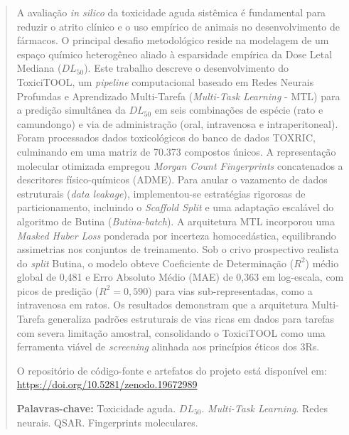\documentclass[12pt, a4paper]{article}
\begin{document}
\newpage
\begin{abstract}
\noindent
A avaliação \textit{in silico} da toxicidade aguda sistêmica é fundamental para reduzir o atrito clínico e o uso empírico de animais no desenvolvimento de fármacos. O principal desafio metodológico reside na modelagem de um espaço químico heterogêneo aliado à esparsidade empírica da Dose Letal Mediana ($DL_{50}$). Este trabalho descreve o desenvolvimento do ToxiciTOOL, um \textit{pipeline} computacional baseado em Redes Neurais Profundas e Aprendizado Multi-Tarefa (\textit{Multi-Task Learning} - MTL) para a predição simultânea da $DL_{50}$ em seis combinações de espécie (rato e camundongo) e via de administração (oral, intravenosa e intraperitoneal). Foram processados dados toxicológicos do banco de dados TOXRIC, culminando em uma matriz de 70.373 compostos únicos. A representação molecular otimizada empregou \textit{Morgan Count Fingerprints} concatenados a descritores físico-químicos (ADME). Para anular o vazamento de dados estruturais (\textit{data leakage}), implementou-se estratégias rigorosas de particionamento, incluindo o \textit{Scaffold Split} e uma adaptação escalável do algoritmo de Butina (\textit{Butina-batch}). A arquitetura MTL incorporou uma \textit{Masked Huber Loss} ponderada por incerteza homocedástica, equilibrando assimetrias nos conjuntos de treinamento. Sob o crivo prospectivo realista do \textit{split} Butina, o modelo obteve Coeficiente de Determinação ($R^2$) médio global de 0,481 e Erro Absoluto Médio (MAE) de 0,363 em log-escala, com picos de predição ($R^2 = 0,590$) para vias sub-representadas, como a intravenosa em ratos. Os resultados demonstram que a arquitetura Multi-Tarefa generaliza padrões estruturais de vias ricas em dados para tarefas com severa limitação amostral, consolidando o ToxiciTOOL como uma ferramenta viável de \textit{screening} alinhada aos princípios éticos dos 3Rs.

O repositório de código-fonte e artefatos do projeto está disponível em: \url{https://doi.org/10.5281/zenodo.19672989}

\vspace{1em}
\noindent\textbf{Palavras-chave:} Toxicidade aguda. $DL_{50}$. \textit{Multi-Task Learning}. Redes neurais. QSAR. Fingerprints moleculares.
\end{abstract}
\end{document}
